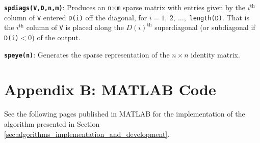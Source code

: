 \documentclass[fleqn,10pt]{../SelfArx} %
\begin{document}
\noindent \texttt{\textbf{spdiags(V,D,n,m)}}: Produces an \texttt{n}$\times$\texttt{m} sparse matrix with entries given by the $i^{\mathrm{th}}$ column of \texttt{V} entered \texttt{D(i)} off the diagonal, for $i=1,~2,~\dots,$ \texttt{length(D)}. That is the $i^{\mathrm{th}}$ column of \texttt{V} is placed along the $D(i)^{\mathrm{th}}$ superdiagonal (or subdiagonal if \texttt{D(i)}$<0$) of the output.
\vskip 0.3cm

\noindent \texttt{\textbf{speye(n)}}: Generates the sparse representation of the $n\times n$ identity matrix. 
\vskip 0.3cm




\section*{Appendix B: MATLAB Code}
See the following pages published in MATLAB for the implementation of the algorithm presented in Section \ref{sec:algorithms_implementation_and_development}.




% 
% 

\end{document}
